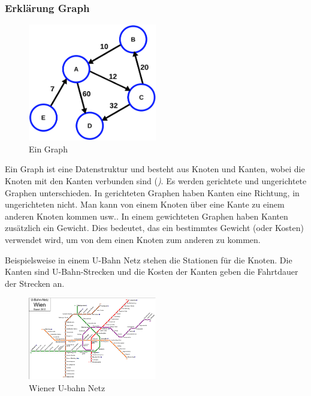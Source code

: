 \documentclass[a4paper,12pt,arial]{scrartcl}
\begin{document}
\subsubsection{Erklärung Graph}
\begin{figure}
    \includegraphics[width=0.5\textwidth]{graph.pdf}
    \caption{Ein Graph \textcite{wikipediaGraph}}
    \label{fig:graph}
\end{figure}
Ein Graph ist eine Datenstruktur und besteht aus Knoten und Kanten, wobei die Knoten  mit den Kanten verbunden sind (\textit{\textcite{biggs1986graph})}.
Es werden gerichtete und ungerichtete Graphen unterschieden.
In gerichteten Graphen haben Kanten eine Richtung, in ungerichteten nicht.
Man kann von einem Knoten über eine Kante zu einem anderen Knoten kommen usw..
In einem gewichteten Graphen haben Kanten zusätzlich ein Gewicht. Dies bedeutet, das ein bestimmtes Gewicht (oder Kosten) verwendet wird, um von dem einen Knoten zum anderen zu kommen.\cite{west1996introduction}

Beispielsweise in einem U-Bahn Netz stehen die Stationen für die Knoten. Die Kanten sind U-Bahn-Strecken und die Kosten der Kanten geben die Fahrtdauer der Strecken an.
\begin{figure}[h]
    \centering
    \includegraphics[width=0.5\textwidth]{u-bahn.pdf}
    \caption{Wiener U-bahn Netz \textcite{wikipediaUbahn}}
    \label{fig:u-bahn-netz}
\end{figure}
\end{document}

